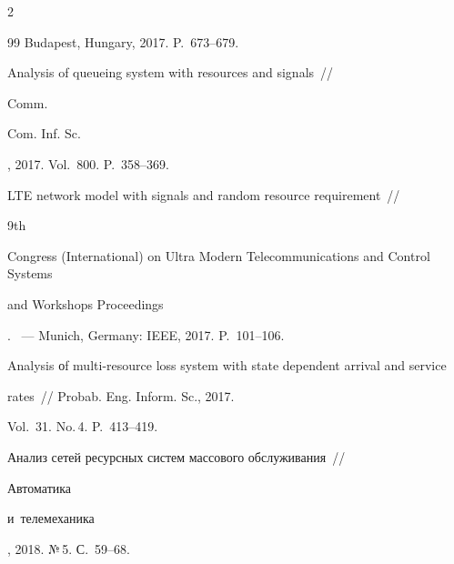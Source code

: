 \begin{multicols}{2}
{{\begin{thebibliography}{99}
Budapest, Hungary, 2017. P.~673--679.











Analysis of queueing system with resources and signals~// {Comm. 


Com. Inf. Sc.}, 2017. Vol.~800. P.~358--369.











LTE network model with signals and random resource requirement~// {9th 


 Congress (International) on Ultra Modern Telecommunications and Control Systems 


and Workshops Proceedings}. ~--- Munich, Germany: IEEE, 2017. P.~101--106.

















Analysis оf multi-resource loss system with state dependent arrival and service 


rates~// {Probab. Eng. Inform. Sc.}, 2017. 


Vol.~31. No.\,4. P.~413--419.











Анализ сетей ресурсных сис\-тем массового обслуживания~// {Автоматика 


и~телемеханика}, 2018. №\,5. С.~59--68.












\end{thebibliography}}}
\end{multicols}
